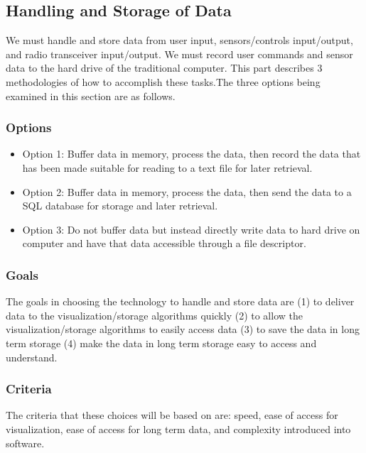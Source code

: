 \documentclass[10pt,draftclsnofoot,onecolumn]{IEEEtran}
\begin{document}
\subsection{Handling and Storage of Data}
We must handle and store data from user input, sensors/controls input/output, and radio transceiver input/output.  We must record user commands and sensor data to the hard drive of the traditional computer. This part describes 3 methodologies of how to accomplish these tasks.The three options being examined in this section are as follows. \\
\subsubsection{Options}
	\begin{itemize}
	\item Option 1: Buffer data in memory, process the data, then record the data that has been made suitable for reading to a text file for later retrieval.
	\item Option 2: Buffer data in memory, process the data, then send the data to a SQL database for storage and later retrieval.
	\item Option 3: Do not buffer data but instead directly write data to hard drive on computer and have that data accessible through a file descriptor.\\
	\end{itemize}
\subsubsection{Goals}
The goals in choosing the technology to handle and store data are (1) to deliver data to the visualization/storage algorithms quickly (2) to allow the visualization/storage algorithms to easily access data (3) to save the data in long term storage (4) make the data in long term storage easy to access and understand.\\

\subsubsection{Criteria}
The criteria that these choices will be based on are: speed, ease of access for visualization, ease of access for long term data, and complexity introduced into software.\\
\end{document}
